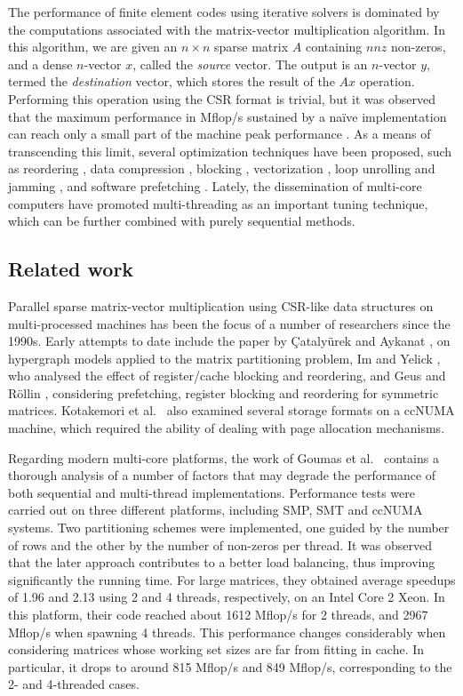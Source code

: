 \documentclass[11pt]{article}
\begin{document}
The performance of finite element codes using iterative
solvers is dominated by the computations associated with the matrix-vector
multiplication algorithm. In this algorithm, we are given an $n \times n$
sparse matrix $A$ containing $nnz$ non-zeros, and a dense $n$-vector $x$,
called the \textit{source} vector.  The output is an $n$-vector $y$, termed the
\textit{destination} vector, which stores the result of the $Ax$ operation.
Performing this operation using the CSR format is trivial, but it was observed
that the maximum performance in Mflop/s sustained by a na\"ive implementation
can reach only a small part of the machine peak performance \cite{GKKS99a}.  As
a means of transcending this limit, several optimization techniques have been
proposed, such as reordering \cite{Tol97a,PH99a,WS97a,TJ92a}, data compression \cite{MGMM05a,WL06a},
blocking \cite{TJ92a,IYV04a,Tol97a,VM05a,PH99a,AGZ92a,NVDY07a}, vectorization \cite{AFM05a,BHZ93a}, loop unrolling
\cite{WS97a} and jamming \cite{MG04a}, and software prefetching \cite{Tol97a}.
Lately, the dissemination of multi-core computers have promoted
multi-threading as an important tuning
technique, which can be further combined with purely sequential methods.

\subsection{Related work}

Parallel sparse matrix-vector multiplication using CSR-like data structures on
multi-processed machines has been the focus of a number of researchers since
the 1990s.  Early attempts to date include the paper by {\c C}ataly\"urek and Aykanat \cite{CA96a}, on
hypergraph models applied to the matrix partitioning problem, Im and Yelick \cite{IY99a},
who analysed the effect of register/cache blocking and reordering, and
Geus and R{\"{o}}llin \cite{GR01a}, considering prefetching, register blocking and reordering for
symmetric matrices.  Kotakemori et al.~\cite{KHKNSN05a} also examined several storage formats on
a ccNUMA machine, which required the ability of dealing with page allocation
mechanisms.

Regarding modern multi-core platforms, the work of Goumas et al.~\cite{GKAKK08a} contains a
thorough analysis of a number of factors that may degrade the performance of
both sequential and multi-thread implementations.  Performance tests were
carried out on three different platforms, including SMP, SMT and ccNUMA
systems.
Two partitioning schemes were implemented, one guided by the number of rows
and the other by the number of non-zeros per thread.  It was
observed that the later approach contributes to a better load balancing,
thus improving significantly the running time.
For large matrices, they obtained average speedups of 1.96 and 2.13 using 2 and
4 threads, respectively, on an Intel Core 2 Xeon.
In this platform, their code reached about 1612 Mflop/s for 2 threads,
and 2967 Mflop/s when spawning 4 threads.
This performance changes
considerably when considering matrices whose working set sizes are far from fitting in cache.
In particular, it drops to around 815 Mflop/s and 849 Mflop/s, corresponding to the 2-
and 4-threaded cases.
\end{document}
